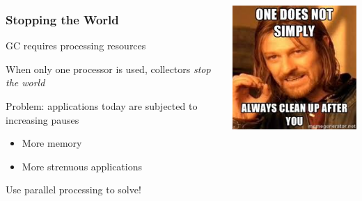 \documentclass{beamer}
\newcommand{\linespace}{\vskip 0.25cm}
\begin{document}
\begin{frame}

\begin{columns}
\begin{column}{0.65\textwidth}

\frametitle{Stopping the World}

GC requires processing resources

\linespace
\linespace

When only one processor is used, collectors \emph{stop the world}

\linespace
\linespace

Problem: applications today are subjected to increasing pauses
\begin{itemize}
\item More memory
\item More strenuous applications
\end{itemize}

\linespace
\linespace

Use parallel processing to solve!
\end{column}
\begin{column}{0.35\textwidth}

\begin{center}
\includegraphics[width=.8\textwidth]{Illustrations/meme.jpg}
\end{center}

\end{column}
\end{columns}

\end{frame}
\end{document}
